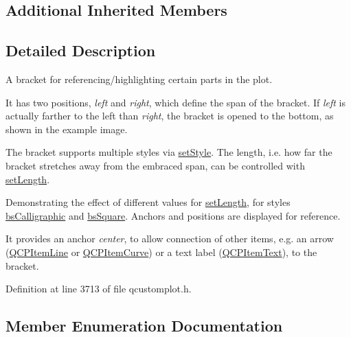 \subsection*{Additional Inherited Members}


\subsection{Detailed Description}
A bracket for referencing/highlighting certain parts in the plot. 

 It has two positions, {\itshape left} and {\itshape right}, which define the span of the bracket. If {\itshape left} is actually farther to the left than {\itshape right}, the bracket is opened to the bottom, as shown in the example image.

The bracket supports multiple styles via \hyperlink{class_q_c_p_item_bracket_a612dffa2373422eef8754d690add3703}{set\+Style}. The length, i.\+e. how far the bracket stretches away from the embraced span, can be controlled with \hyperlink{class_q_c_p_item_bracket_ac7cfc3da7da9b5c5ac5dfbe4f0351b2a}{set\+Length}.

 \begin{center}Demonstrating the effect of different values for \hyperlink{class_q_c_p_item_bracket_ac7cfc3da7da9b5c5ac5dfbe4f0351b2a}{set\+Length}, for styles \hyperlink{class_q_c_p_item_bracket_a7ac3afd0b24a607054e7212047d59dbda8f29f5ef754e2dc9a9efdedb2face0f3}{bs\+Calligraphic} and \hyperlink{class_q_c_p_item_bracket_a7ac3afd0b24a607054e7212047d59dbda7f9df4a7359bfe3dac1dbe4ccf5d220c}{bs\+Square}. Anchors and positions are displayed for reference.\end{center} 

It provides an anchor {\itshape center}, to allow connection of other items, e.\+g. an arrow (\hyperlink{class_q_c_p_item_line}{Q\+C\+P\+Item\+Line} or \hyperlink{class_q_c_p_item_curve}{Q\+C\+P\+Item\+Curve}) or a text label (\hyperlink{class_q_c_p_item_text}{Q\+C\+P\+Item\+Text}), to the bracket. 

Definition at line 3713 of file qcustomplot.\+h.



\subsection{Member Enumeration Documentation}
\hypertarget{class_q_c_p_item_bracket_a7f3a6a56d67f71219ed220553f3dd861}{}
